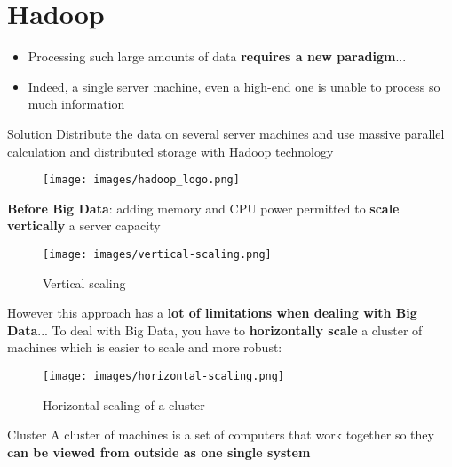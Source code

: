 \documentclass{beamer}[10pt, usepdftitle=false handout]
\begin{document}
	\section{Hadoop}	
	
	
	\begin{frame}
	

	\begin{itemize}
		\item{Processing such large amounts of data \textbf{requires a new paradigm}...}
		\item{Indeed, a single server machine, even a high-end one is unable to process so much information}
	\end{itemize}
	
	\begin{block}{Solution}
	Distribute the data on several server machines and use massive parallel calculation and distributed storage with Hadoop technology
	\end{block}	

	\begin{figure}
	\texttt{[image: images/hadoop\_logo.png]} 
	\end{figure}			
	
	\end{frame}	
	
	
	\begin{frame}
	
	\textbf{Before Big Data}: adding memory and CPU power permitted to \textbf{scale vertically} a server capacity	
	\vspace*{0.6em}	


	\begin{figure}
	\texttt{[image: images/vertical-scaling.png]} 
     	\vspace*{-0.5em}
		\caption{Vertical scaling}
	\end{figure}	
	
	However this approach has a \textbf{lot of limitations when dealing with Big Data}... To deal with Big Data, you have to \textbf{horizontally scale} a cluster of machines which is easier to scale and more robust:
	\vspace{0.6em}		
	
	\begin{figure}
	\texttt{[image: images/horizontal-scaling.png]} 
     	\vspace*{-0.5em}
		\caption{Horizontal scaling of a cluster}
	\end{figure}	
	
	\begin{block}{Cluster}
	A cluster of machines is a set of computers that work together so they \textbf{can be viewed from outside as one single system}	
	\end{block}	
	
	
	\end{frame}
	
\end{document}
